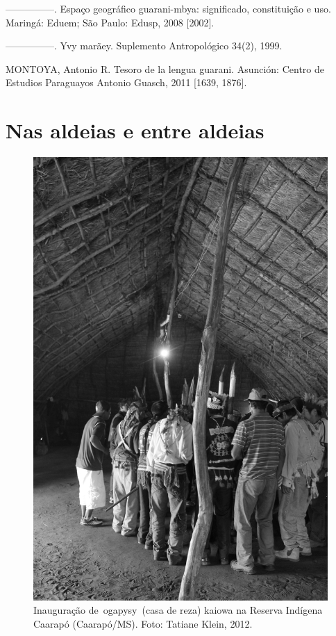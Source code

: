 —————. Espaço geográfico guarani-mbya: significado, constituição e uso.
Maringá: Eduem; São Paulo: Edusp, 2008 [2002].

—————. Yvy marãey. Suplemento Antropológico 34(2), 1999.

MONTOYA, Antonio R. Tesoro de la lengua guarani. Asunción: Centro de
Estudios Paraguayos Antonio Guasch, 2011 [1639, 1876].

\part{Nas aldeias e entre aldeias}

\begin{figure}
  \centering
 \includegraphics[width=\textwidth]{./img/GUARANIS-img6.jpg}	
  \hfill
  \caption{Inauguração de~ogapysy~(casa de reza) kaiowa na Reserva Indígena
Caarapó (Caarapó/MS). Foto: Tatiane Klein, 2012.}
\end{figure}

